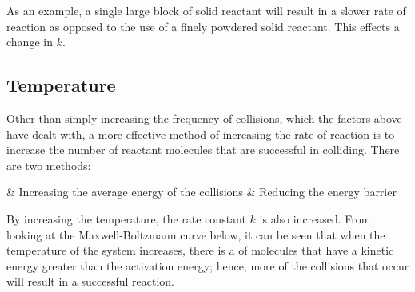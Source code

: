 			As an example, a single large block of solid reactant will result in a slower rate of reaction as opposed to the use of a
			finely powdered solid reactant. This effects a change in $k$.



		\pagebreak
		\subsection{Temperature}

			Other than simply increasing the frequency of collisions, which the factors above have dealt with, a more effective method of
			increasing the rate of reaction is to increase the number of reactant molecules that are successful in colliding. There are two methods:

			\begin{bulletlist}
				& Increasing the average energy of the collisions
				& Reducing the energy barrier
			\end{bulletlist}

			By increasing the temperature, the rate constant $k$ is also increased. From looking at the Maxwell-Boltzmann curve below, it can be seen that
			when the temperature of the system increases, there is a  of molecules that have a kinetic energy greater
			than the activation energy; hence, more of the collisions that occur will result in a successful reaction.


